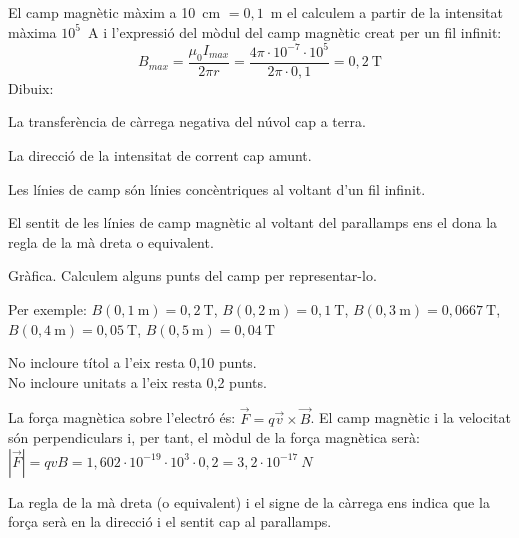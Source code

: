 \begin{solapartat}
 El camp magnètic màxim a 10~cm $= 0,1$~m el calculem a partir de la intensitat màxima $10^{5}$~A i l'expressió del mòdul del camp magnètic creat per un fil infinit:
\[ B_{max} = \frac{\mu_0 I_{max}}{2\pi r} = \frac{4\pi\cdot 10^{-7}\cdot 10^{5}}{2\pi\cdot 0,1} = 0,2\ \mathrm{T} \]
Dibuix:

 La transferència de càrrega negativa del núvol cap a terra.

 La direcció de la intensitat de corrent cap amunt.

 Les línies de camp són línies concèntriques al voltant d'un fil infinit.

 El sentit de les línies de camp magnètic al voltant del parallamps ens el dona la regla de la mà dreta o equivalent.

\end{solapartat}

\begin{solapartat}
 Gràfica. Calculem alguns punts del camp per representar-lo.

Per exemple: $B(0,1\ \mathrm{m}) = 0,2\ \mathrm{T}$, $B(0,2\ \mathrm{m}) = 0,1\ \mathrm{T}$, $B(0,3\ \mathrm{m}) = 0,0667\ \mathrm{T}$, $B(0,4\ \mathrm{m}) = 0,05\ \mathrm{T}$, $B(0,5\ \mathrm{m}) = 0,04\ \mathrm{T}$

No incloure títol a l'eix resta 0,10 punts.\\
No incloure unitats a l'eix resta 0,2 punts.


 La força magnètica sobre l'electró és: $\vec{F} = q\vec{v}\times\vec{B}$. El camp magnètic i la velocitat són perpendiculars i, per tant, el mòdul de la força magnètica serà: $|\vec{F}| = qvB = 1,602\cdot 10^{-19}\cdot 10^{3}\cdot 0,2 = 3,2\cdot 10^{-17}\ N$

 La regla de la mà dreta (o equivalent) i el signe de la càrrega ens indica que la força serà en la direcció i el sentit cap al parallamps.

\end{solapartat}
